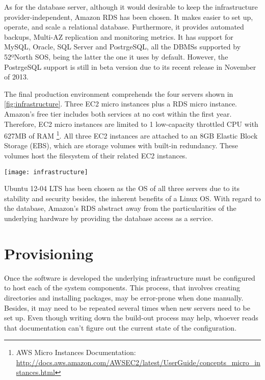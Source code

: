As for the database server, although it would desirable to keep the infrastructure provider-independent, Amazon RDS has been chosen. It makes easier to set up, operate, and scale a relational database. Furthermore, it provides automated backups, Multi-AZ replication and monitoring metrics. It has support for MySQL, Oracle, SQL Server and PostrgeSQL, all the DBMSs supported by 52ºNorth SOS, being the latter the one it uses by default. However, the PostrgeSQL support is still in beta version due to its recent release in November of 2013.

The final production environment comprehends the four servers shown in \ref{fig:infrastructure}. Three EC2 micro instances plus a RDS micro instance. Amazon's free tier includes both services at no cost within the first year. Therefore, EC2 micro instances are limited to 1 low-capacity throttled CPU with 627MB of RAM \footnote{AWS Micro Instances Documentation: \url{http://docs.aws.amazon.com/AWSEC2/latest/UserGuide/concepts_micro_instances.html}}. All three EC2 instances are attached to an 8GB Elastic Block Storage (EBS), which are storage volumes with built-in redundancy. These volumes host the filesystem of their related EC2 instances.

\begin{sidewaysfigure}
  \centering
  \texttt{[image: infrastructure]}
  \caption{Production's infrastructure diagram}
  \label{fig:infrastructure}
\end{sidewaysfigure}

Ubuntu 12-04 LTS has been chosen as the OS of all three servers due to its stability and security besides, the inherent benefits of a Linux OS. With regard to the database, Amazon's RDS abstract away from the particularities of the underlying hardware by providing the database access as a service.

\section{Provisioning}

Once the software is developed the underlying infrastructure must be configured to host each of the system components. This process, that involves creating directories and installing packages, may be error-prone when done manually. Besides, it may need to be repeated several times when new servers need to be set up. Even though writing down the build-out process may help, whoever reads that documentation can't figure out the current state of the configuration.

